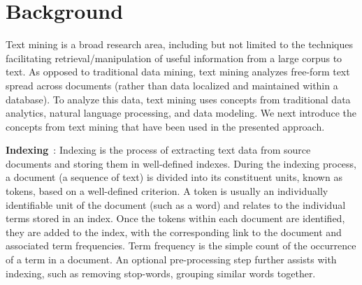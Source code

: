 \section{Background}
\label{sec:background}


Text mining is a broad research area, 
including but not limited to the techniques 
facilitating retrieval/manipulation of useful information from a large corpus to text. 
As opposed to traditional data mining, text mining analyzes
free-form text spread across documents
(rather than data localized and maintained within a database).
To analyze this data, text mining uses concepts from traditional
data analytics, natural language processing, and data modeling.
We next introduce the concepts from text mining that have been used in the presented approach.


\textbf{Indexing}~\cite{frakes1992introduction,manning2008introduction}:
Indexing is the process of extracting text data from source documents
and storing them in well-defined indexes.
During the indexing process, a document (a sequence of text) is divided into its constituent units, known as tokens, based on a well-defined criterion. 
A token is usually an individually identifiable unit of the document (such as a word) and relates to the individual terms stored in an index. Once the tokens within each document are identified, they are added to the index, with the corresponding link to the document and associated term frequencies.
Term frequency is the simple count of the occurrence of a term in a document.
An optional pre-processing step further assists with indexing, such as removing stop-words, grouping similar words together. 


